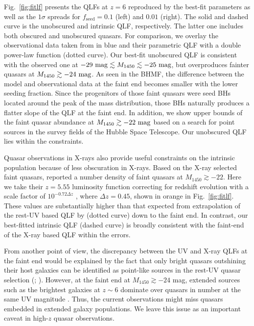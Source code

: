\documentclass[twocolumn, twocolappendix]{aastex63}
\newcommand{\fseed}{f_\mathrm{seed}}
\newcommand{\Muv}{M_{1450}}
\begin{document}
\begin{CJK*}{UTF8}{gbsn}
Fig.~\ref{fig:fitlf} presents the QLFs at $z=6$ reproduced by the best-fit parameters as well as the $1\sigma$ spreads
for $\fseed = 0.1$ (left) and $0.01$ (right).
The solid and dashed curve is the unobscured and intrinsic QLF, respectively.
The latter one includes both obscured and unobscured quasars.
For comparison, we overlay the observational data taken from  in blue
and their parametric QLF with a double power-law function (dotted curve).
Our best-fit unobscured QLF is consistent with the observed one at $-29~{\rm mag} \lesssim \Muv \lesssim -25~{\rm mag}$,
but overproduces fainter quasars at $\Muv\gtrsim -24~{\rm mag}$.
As seen in the BHMF, the difference between the model and observational data at the faint end becomes smaller with
the lower seeding fraction.
Since the progenitors of those faint quasars were seed BHs located around the peak of the mass distribution,
those BHs naturally produces a flatter slope of the QLF at the faint end.
In addition, we show upper bounds of the faint quasar abundance at $\Muv\gtrsim -22~{\rm mag}$ \citep[green;][]{2022NatAs...6..850J}
based on a search for point sources in the survey fields of the Hubble Space Telescope.
Our unobscured QLF lies within the constraints.


Quasar observations in X-rays also provide 
useful constraints on the intrinsic population because of less obscuration in X-rays.
Based on the X-ray selected faint quasars, \cite{2019ApJ...884...19G} reported a number density of 
faint quasars at $\Muv \gtrsim -22$.
Here we take their $z=5.55$ luminosity function correcting for redshift evolution 
with a scale factor of $10^{-0.72\Delta z}$ \citep{2016ApJ...833..222J}, where $\Delta z=0.45$,
shown in orange in Fig.~\ref{fig:fitlf}.
These values are substantially higher than that expected from extrapolation of the rest-UV based QLF by 
 (dotted curve) down to the faint end.
In contrast, our best-fitted intrinsic QLF (dashed curve) is broadly consistent with the faint-end of the X-ray based QLF within the errors.

From another point of view, the discrepancy between the UV and X-ray QLFs at the faint end would be explained by the fact that 
only bright quasars outshining their host galaxies can be identified as point-like sources in the rest-UV quasar selection 
(; \citealt{2020MNRAS.495.2135N,2020MNRAS.494.1771A,2021MNRAS.502.2757O,2021MNRAS.502..662B,2022arXiv220712282K}).
However, at the faint end at $\Muv\gtrsim -24$ mag, extended sources such as the brightest galaxies at $z\sim 6$ 
dominate over quasars in number at the same UV magnitude \citep{2022ApJS..259...20H}.
Thus, the current observations might miss quasars embedded in extended galaxy populations. 
We leave this issue as an important caveat in high-$z$ quasar observations.



\end{CJK*}
\end{document}
